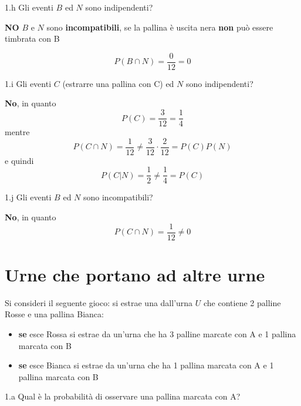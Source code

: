 \documentclass[
  11pt,
]{book}
\providecommand{\tightlist}{%
  \setlength{\itemsep}{0pt}\setlength{\parskip}{0pt}}
\theoremstyle{mytheoremstyle}
\theoremstyle{mydefstyle}
\newenvironment{sol}
  {
  \begin{tcolorbox}[enhanced,breakable,arc=0.1mm,boxrule=1pt,colback=white,colframe=iblue,
  title=\bf \fontfamily{lmss}\selectfont \hspace{.5 cm} Soluzione,drop fuzzy shadow]

}{
\end{tcolorbox}
  }
\begin{document}
1.h Gli eventi \(B\) ed \(N\) sono indipendenti?

\begin{sol}
\textbf{NO} \(B\) e \(N\) sono \textbf{incompatibili}, se la pallina è uscita nera \textbf{non} può essere timbrata con B

\[P(B\cap N)=\frac0{12}=0\]

\end{sol}

1.i Gli eventi \(C\) (estrarre una pallina con C) ed \(N\) sono indipendenti?

\begin{sol}
\textbf{No}, in quanto
\[
P(C)=\frac3{12}=\frac14
\]
mentre
\[
P(C\cap N)=\frac1{12}\neq \frac{3}{12}\cdot\frac2{12}=P(C)P(N)
\]
e quindi
\[
P(C|N)=\frac12\neq\frac14=P(C)
\]

\end{sol}

1.j Gli eventi \(B\) ed \(N\) sono incompatibili?

\begin{sol}
\textbf{No}, in quanto
\[
P(C\cap N)=\frac1{12}\neq 0
\]

\end{sol}

\section{Urne che portano ad altre urne}\label{urne-che-portano-ad-altre-urne}

Si consideri il seguente gioco: si estrae una dall'urna \(U\) che contiene 2 palline Rosse e una pallina Bianca:
\small

\begin{itemize}
\tightlist
\item
  \textbf{se} esce Rossa si estrae da un'urna che ha 3 palline marcate con A e 1 pallina marcata con B
\item
  \textbf{se} esce Bianca si estrae da un'urna che ha 1 pallina marcata con A e 1 pallina marcata con B
\end{itemize}

\rm

1.a Qual è la probabilità di osservare una pallina marcata con A?
\end{document}
